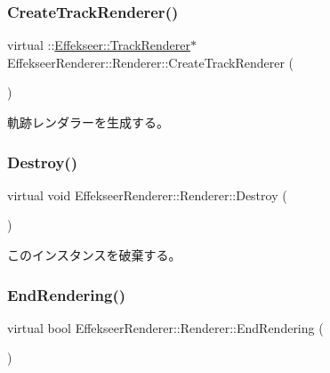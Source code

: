 \subsubsection{\texorpdfstring{Create\+Track\+Renderer()}{CreateTrackRenderer()}}
{\footnotesize\ttfamily virtual \+::\mbox{\hyperlink{class_effekseer_1_1_track_renderer}{Effekseer\+::\+Track\+Renderer}}$\ast$ Effekseer\+Renderer\+::\+Renderer\+::\+Create\+Track\+Renderer (\begin{DoxyParamCaption}{ }\end{DoxyParamCaption})\hspace{0.3cm}{\ttfamily [pure virtual]}}



軌跡レンダラーを生成する。 

\mbox{\label{class_effekseer_renderer_1_1_renderer_a8da94391eb26a2bd04830e4d7fcd0bd0}} 
\subsubsection{\texorpdfstring{Destroy()}{Destroy()}}
{\footnotesize\ttfamily virtual void Effekseer\+Renderer\+::\+Renderer\+::\+Destroy (\begin{DoxyParamCaption}{ }\end{DoxyParamCaption})\hspace{0.3cm}{\ttfamily [pure virtual]}}



このインスタンスを破棄する。 

\mbox{\label{class_effekseer_renderer_1_1_renderer_aaa6df6f62aead71652bdeb596d0a7ef4}} 
\subsubsection{\texorpdfstring{End\+Rendering()}{EndRendering()}}
{\footnotesize\ttfamily virtual bool Effekseer\+Renderer\+::\+Renderer\+::\+End\+Rendering (\begin{DoxyParamCaption}{ }\end{DoxyParamCaption})\hspace{0.3cm}{\ttfamily [pure virtual]}}



